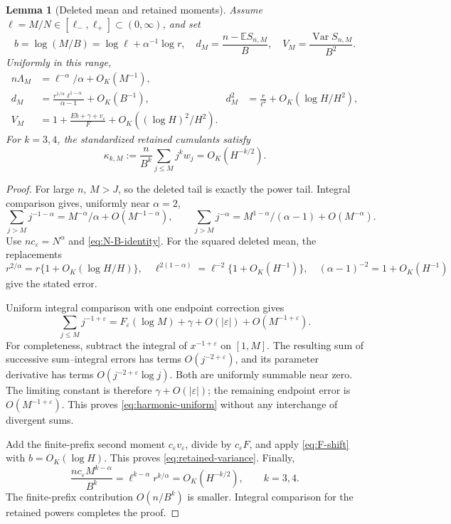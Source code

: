 \documentclass[11pt,a4paper]{article}
\numberwithin{equation}{section}
\newtheorem{lemma}[theorem]{Lemma}
\theoremstyle{definition}
\theoremstyle{remark}
\newcommand{\eps}{\varepsilon}
\newcommand{\E}{\mathbb E}
\newcommand{\FF}{F_{\eps}}
\DeclareMathOperator{\Var}{Var}
\begin{document}
\begin{lemma}[Deleted mean and retained moments]
\label{lem:cutoff-moments}
Assume \(\ell=M/N\in[\ell_-,\ell_+]\subset(0,\infty)\), and set
\begin{equation}
 b=\log(M/B)=\log\ell+\alpha^{-1}\log r,
 \quad d_M=\frac{n-\E S_{n,M}}B,
 \quad V_M=\frac{\Var S_{n,M}}{B^2}.
 \label{eq:cutoff-vars}
\end{equation}
Uniformly in this range,
\begin{align}
 n\Lambda_M&=\ell^{-\alpha}/\alpha+O_K(M^{-1}),\label{eq:tail-rate}\\
 d_M&=\frac{r^{1/\alpha}\ell^{1-\alpha}}{\alpha-1}+O_K(B^{-1}),
 &d_M^2&=\frac{r}{\ell^2}+O_K(\log H/H^2),\label{eq:deleted-mean}\\
 V_M&=1+\frac{Eb+\gamma+v_{\eps}}F
      +O_K((\log H)^2/H^2).\label{eq:retained-variance}
\end{align}
For \(k=3,4\), the standardized retained cumulants satisfy
\begin{equation}
 \kappa_{k,M}:=\frac n{B^k}\sum_{j\le M}j^kw_j
 =O_K(H^{-k/2}).
 \label{eq:retained-cumulants}
\end{equation}
\end{lemma}
\begin{proof}
For large \(n\), \(M>J\), so the deleted tail is exactly the power tail.
Integral comparison gives, uniformly near \(\alpha=2\),
\[
 \sum_{j>M}j^{-1-\alpha}=M^{-\alpha}/\alpha+O(M^{-1-\alpha}),
 \qquad
 \sum_{j>M}j^{-\alpha}=M^{1-\alpha}/(\alpha-1)+O(M^{-\alpha}).
\]
Use \(nc_{\eps}=N^\alpha\) and \eqref{eq:N-B-identity}.
For the squared deleted mean, the replacements
\[
 r^{2/\alpha}=r\{1+O_K(\log H/H)\},\quad
 \ell^{2(1-\alpha)}=\ell^{-2}\{1+O_K(H^{-1})\},\quad
 (\alpha-1)^{-2}=1+O_K(H^{-1})
\]
give the stated error.

Uniform integral comparison with one endpoint correction gives
\begin{equation}
 \sum_{j\le M}j^{-1+\eps}
 =\FF(\log M)+\gamma+O(|\eps|)+O(M^{-1+\eps}).
 \label{eq:harmonic-uniform}
\end{equation}
For completeness, subtract the integral of \(x^{-1+\eps}\) on \([1,M]\).
The resulting sum of successive sum--integral errors has terms
\(O(j^{-2+\eps})\), and its parameter derivative has terms
\(O(j^{-2+\eps}\log j)\). Both are uniformly summable near zero.
The limiting constant is therefore \(\gamma+O(|\eps|)\); the remaining
endpoint error is \(O(M^{-1+\eps})\). This proves
\eqref{eq:harmonic-uniform} without any interchange of divergent sums.

Add the finite-prefix second moment \(c_{\eps}v_{\eps}\), divide by
\(c_{\eps}F\), and apply \eqref{eq:F-shift} with \(b=O_K(\log H)\).
This proves \eqref{eq:retained-variance}. Finally,
\[
 \frac{nc_{\eps}M^{k-\alpha}}{B^k}
 =\ell^{k-\alpha}r^{k/\alpha}=O_K(H^{-k/2}),\qquad k=3,4.
\]
The finite-prefix contribution \(O(n/B^k)\) is smaller. Integral comparison
for the retained powers completes the proof.
\end{proof}
\end{document}
